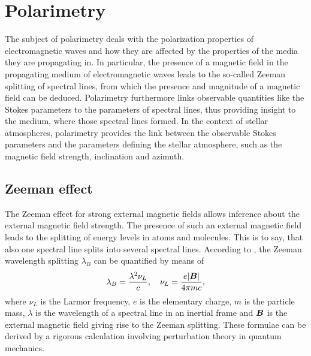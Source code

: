 \documentclass[a4paper,12pt]{report}
\begin{document}
\section{Polarimetry}
The subject of polarimetry deals with the polarization properties of electromagnetic waves and how they are affected by the properties of the media they are propagating in. In particular, the presence of a magnetic field in the propagating medium of electromagnetic waves leads to the so-called Zeeman splitting of spectral lines, from which the presence and magnitude of a magnetic field can be deduced. Polarimetry furthermore links observable quantities like the Stokes parameters to the parameters of spectral lines, thus providing insight to the medium, where those spectral lines formed. In the context of stellar atmospheres, polarimetry provides the link between the observable Stokes parameters and the parameters defining the stellar atmosphere, such as the magnetic field strength, inclination and azimuth.

\subsection{Zeeman effect}
The Zeeman effect for strong external magnetic fields allows inference about the external magnetic field strength. The presence of such an external magnetic field leads to the splitting of energy levels in atoms and molecules. This is to say, that also one spectral line splits into several spectral lines. According to \cite[p.123]{delToroIniesta.2003}, the Zeeman wavelength splitting $\lambda_B$ can be quantified by means of \begin{equation}
\lambda_B = \frac{\lambda^2 \nu_L}{c}, \quad \nu_L = \frac{e|\bm{B}|}{4\pi m c},
\end{equation} where $\nu_L$ is the Larmor frequency, $e$ is the elementary charge, $m$ is the particle mass, $\lambda$ is the wavelength of a spectral line in an inertial frame and $\bm{B}$ is the external magnetic field giving rise to the Zeeman splitting. These formulae can be derived by a rigorous calculation involving perturbation theory in quantum mechanics.
\end{document}
